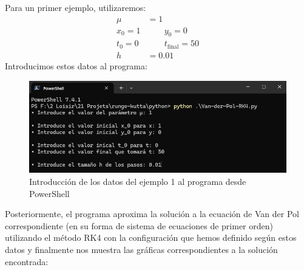 \documentclass[12pt, a4paper]{article}
\begin{document}
Para un primer ejemplo, utilizaremos:
\begin{align*}
    \mu &= 1 \\
    x_{0} = 1 &\qquad y_{0} = 0 \\
    t_{0} = 0 &\qquad t_{\text{final}} = 50 \\
    h &= 0.01
\end{align*}
Introducimos estos datos al programa:
\begin{figure}[H]
	\centering
	\includegraphics[scale=0.65]{../auxiliary/assets/ejemplo1-datos.png}
	\caption{Introducción de los datos del ejemplo 1 al programa desde PowerShell}
\end{figure}
Posteriormente, el programa aproxima la solución a la ecuación de Van der Pol correspondiente (en su forma de sistema de ecuaciones de primer orden) utilizando el método RK4 con la configuración que hemos definido según estos datos y finalmente nos muestra las gráficas correspondientes a la solución encontrada:
\end{document}
